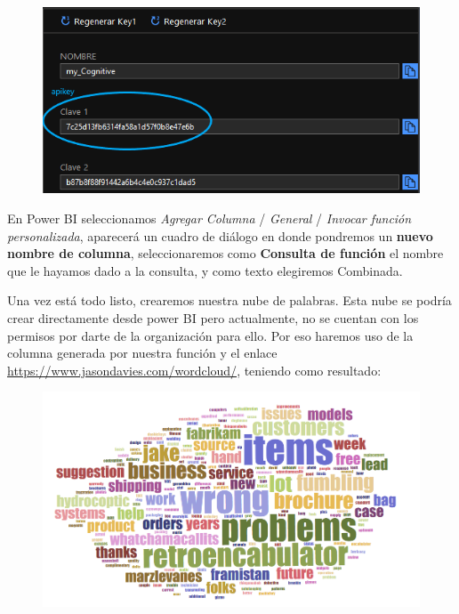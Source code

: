 \documentclass[english,runningheads,a4paper]{llncs}[2018/03/10]
\begin{document}
    \begin{figure}[h!]
        \centering
        \includegraphics[scale=0.25]{./IA/AZURE/keyconf.png}
        \caption{}
    \end{figure}
    
    
    En Power BI seleccionamos \textit{Agregar Columna} / \textit{General} / 
    \textit{Invocar función personalizada}, aparecerá un cuadro de diálogo en 
    donde pondremos un \textbf{nuevo nombre de columna}, seleccionaremos como 
    \textbf{Consulta de función} el nombre que le hayamos dado a la consulta, y 
    como texto elegiremos Combinada.
    
    Una vez está todo listo, crearemos nuestra nube de palabras. Esta nube se 
    podría crear directamente desde power BI pero actualmente, no se cuentan 
    con los permisos por darte de la organización para ello. Por eso haremos 
    uso de la columna generada por nuestra función y el enlace 
    \url{https://www.jasondavies.com/wordcloud/}, teniendo como resultado: 
    
    \begin{figure}[h!]
        \centering
        \includegraphics[scale=0.5]{./IA/AZURE/wordcloud.png}
        \caption{}
    \end{figure}
    
\end{document}
